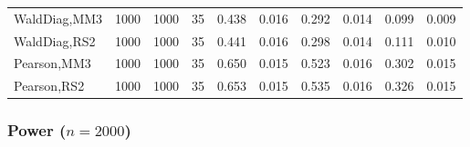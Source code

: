 \documentclass[
]{article}
\begin{document}
\begin{table}[H]
{\begin{tabular}[t]{lrrrrrrlrr}
\hspace{1em}WaldDiag,MM3 & 1000 & 1000 & 35 & 0.438 & 0.016 & 0.292 & 0.014 & 0.099 & 0.009\\
\hspace{1em}WaldDiag,RS2 & 1000 & 1000 & 35 & 0.441 & 0.016 & 0.298 & 0.014 & 0.111 & 0.010\\
\hspace{1em}Pearson,MM3 & 1000 & 1000 & 35 & 0.650 & 0.015 & 0.523 & 0.016 & 0.302 & 0.015\\
\hspace{1em}Pearson,RS2 & 1000 & 1000 & 35 & 0.653 & 0.015 & 0.535 & 0.016 & 0.326 & 0.015\\
\bottomrule
\end{tabular}}
\endgroup{}
\end{table}

\hypertarget{power-n2000-1}{%
\subsubsection{\texorpdfstring{Power
(\(n=2000\))}{Power (n=2000)}}\label{power-n2000-1}}
\end{document}
